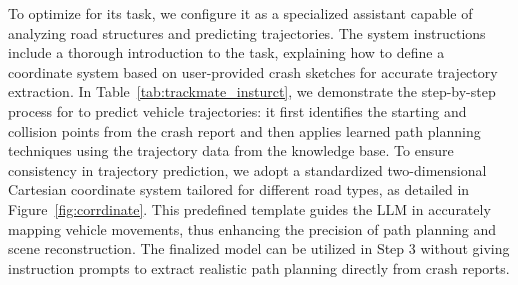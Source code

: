 To optimize {\tooltwo} for its task, we configure it as a specialized assistant capable of analyzing road structures and predicting trajectories. The system instructions include a thorough introduction to the task, explaining how to define a coordinate system based on user-provided crash sketches for accurate trajectory extraction. In Table~\ref{tab:trackmate_insturct}, we demonstrate the step-by-step process for {\tooltwo} to predict vehicle trajectories: it first identifies the starting and collision points from the crash report and then applies learned path planning techniques using the trajectory data from the knowledge base. To ensure consistency in trajectory prediction, we adopt a standardized two-dimensional Cartesian coordinate system tailored for different road types, as detailed in Figure~\ref{fig:corrdinate}. This predefined template guides the LLM in accurately mapping vehicle movements, thus enhancing the precision of path planning and scene reconstruction. The finalized {\tooltwo} model can be utilized in Step 3%
without giving instruction prompts to extract realistic path planning directly from crash reports.







